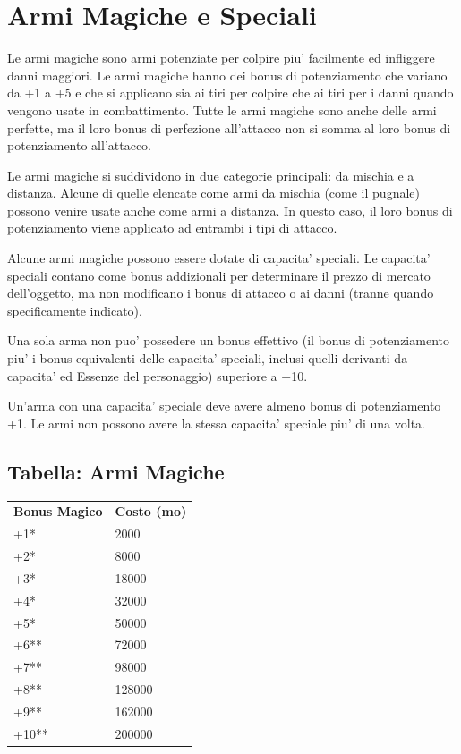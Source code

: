 \documentclass[a4paper,11pt,twoside,openany]{book}
\begin{document}
\pagebreak

\section{Armi Magiche e Speciali}

\label{armi-magiche-e-speciali}

Le armi magiche sono armi potenziate per colpire piu' facilmente ed infliggere danni maggiori. Le armi magiche hanno dei bonus di potenziamento che variano da +1 a +5 e che si applicano sia ai tiri per colpire che ai tiri per i danni quando vengono usate in combattimento. Tutte le armi magiche sono anche delle armi perfette, ma il loro bonus di perfezione all'attacco non si somma al loro bonus di potenziamento all'attacco.

Le armi magiche si suddividono in due categorie principali: da mischia e a distanza. Alcune di quelle elencate come armi da mischia (come il pugnale) possono venire usate anche come armi a distanza. In questo caso, il loro bonus di potenziamento viene applicato ad entrambi i tipi di attacco.

Alcune armi magiche possono essere dotate di capacita' speciali. Le capacita' speciali contano come bonus addizionali per determinare il prezzo di mercato dell'oggetto, ma non modificano i bonus di attacco o ai danni (tranne quando specificamente indicato).

Una sola arma non puo' possedere un bonus effettivo (il bonus di potenziamento piu' i bonus equivalenti delle capacita' speciali, inclusi quelli derivanti da capacita' ed Essenze del personaggio) superiore a +10. 

Un'arma con una capacita' speciale deve avere almeno bonus di potenziamento +1. Le armi non possono avere la stessa capacita' speciale piu' di una volta.



\subsection{Tabella: Armi Magiche}

\label{tabella-armi-magiche}

\begin{tabular}{ll}
\toprule
\textbf{Bonus Magico} & \textbf{Costo (mo)}\tabularnewline
+1{*} & 2000\tabularnewline
+2{*} & 8000\tabularnewline
+3{*} & 18000\tabularnewline
+4{*} & 32000\tabularnewline
+5{*} & 50000\tabularnewline
+6{*}{*} & 72000\tabularnewline
+7{*}{*} & 98000\tabularnewline
+8{*}{*} & 128000\tabularnewline
+9{*}{*} & 162000\tabularnewline
+10{*}{*} & 200000\tabularnewline

\end{tabular}
\end{document}
